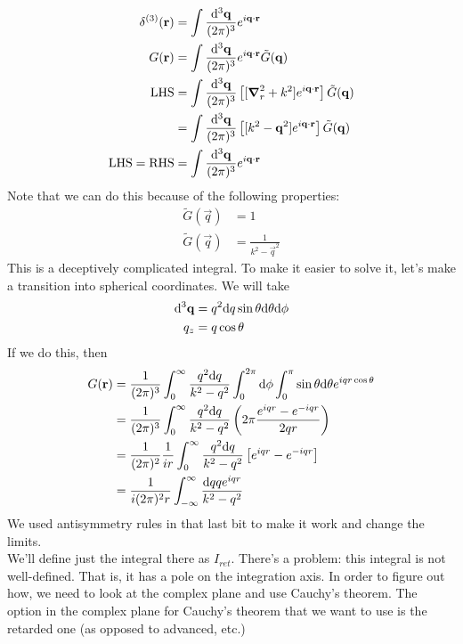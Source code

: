 \documentclass[a4paper]{article}
\begin{document}
\begin{align*}
	\delta^{(3)}(\boldsymbol{\mathbf{r}}) &= \int\frac{\mathrm{d}^3\boldsymbol{\mathbf{q}}}{(2\pi)^3}
	e^{i\boldsymbol{\mathbf{q}}\cdot\boldsymbol{\mathbf{r}}}\\
	G(\boldsymbol{\mathbf{r}}) &= \int\frac{\mathrm{d}^3\boldsymbol{\mathbf{q}}}{(2\pi)^3}
	e^{i\boldsymbol{\mathbf{q}}\cdot\boldsymbol{\mathbf{r}}}\tilde{G}(\boldsymbol{\mathbf{q}})\\
	\text{LHS} &= \int\frac{\mathrm{d}^3\boldsymbol{\mathbf{q}}}{(2\pi)^3} \left[[\boldsymbol{\mathbf{\nabla}}_r^2+k^2]
	e^{i\boldsymbol{\mathbf{q}}\cdot\boldsymbol{\mathbf{r}}}\right]\tilde{G}(\boldsymbol{\mathbf{q}})\\
	&= \int\frac{\mathrm{d}^3\boldsymbol{\mathbf{q}}}{(2\pi)^3} \left[[k^2-\boldsymbol{\mathbf{q}}^2]
	e^{i\boldsymbol{\mathbf{q}}\cdot\boldsymbol{\mathbf{r}}}\right]\tilde{G}(\boldsymbol{\mathbf{q}})\\
	\text{LHS} = \text{RHS} &= \int \frac{\mathrm{d}^3\boldsymbol{\mathbf{q}}}{(2\pi)^3}
	e^{i\boldsymbol{\mathbf{q}}\cdot\boldsymbol{\mathbf{r}}}
\end{align*}
Note that we can do this because of the following properties:
\begin{align*}
	[k^2-\vec{q}^2]\tilde{G}(\vec{q}) &= 1\\
	\tilde{G}(\vec{q}) &= \frac{1}{k^2-\vec{q}^2}
\end{align*}
This is a deceptively complicated integral. To make it easier to solve it,
let's make a transition into spherical coordinates. We will take
\begin{align*}
	\mathrm{d}^3\boldsymbol{\mathbf{q}} &= q^2\mathrm{d} q\sin\theta\mathrm{d}\theta\mathrm{d}\phi\\
	q_z &= q\cos\theta
\end{align*}
If we do this, then
\begin{align*}
	G(\boldsymbol{\mathbf{r}}) &= \frac{1}{(2\pi)^3}
	\int_0^\infty\frac{q^2\mathrm{d} q}{k^2-q^2}
	\int_0^{2\pi}\mathrm{d}\phi
	\int_0^\pi\sin\theta\mathrm{d}\theta e^{iqr\cos\theta}\\
	&= \frac{1}{(2\pi)^3}
	\int_0^\infty\frac{q^2\mathrm{d} q}{k^2-q^2}\left(2\pi
	\frac{e^{iqr}-e^{-iqr}}{2qr}\right)\\
	&= \frac{1}{(2\pi)^2}\frac{1}{ir}
	\int_0^\infty\frac{q^2\mathrm{d} q}{k^2-q^2}
	\left[e^{iqr}-e^{-iqr}\right]\\
	&= \frac{1}{i(2\pi)^2r}\int_{-\infty}^{\infty}
	\frac{\mathrm{d} q q e^{iqr}}{k^2-q^2}
\end{align*}
We used antisymmetry rules in that last bit to make it work and change the
limits.\\
We'll define just the integral there as $I_{ret}$. There's a problem: this
integral is not well-defined. That is, it has a pole on the integration axis.
In order to figure out how, we need to look at the complex plane and
use Cauchy's theorem. The option in the complex plane for Cauchy's theorem that
we want to use is the retarded one (as opposed to advanced, etc.)
\end{document}
